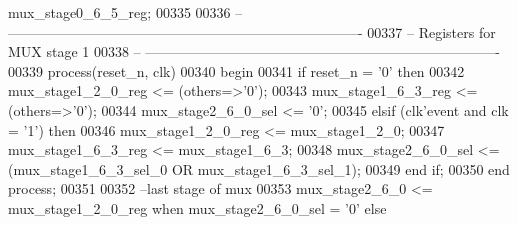 \begin{DoxyCode}
{      mux_stage0_6_5_reg};
00335 
00336 \textcolor{keyword}{-- ----------------------------------------------------------------------------}
00337 \textcolor{keyword}{-- Registers for MUX stage 1}
00338 \textcolor{keyword}{-- ---------------------------------------------------------------------------- }
00339 \textcolor{keywordflow}{process}(reset_n, clk)
00340 \textcolor{vhdlkeyword}{begin}
00341    \textcolor{keywordflow}{if} \textcolor{vhdlchar}{reset_n} \textcolor{vhdlchar}{=} \textcolor{vhdlchar}{'}\textcolor{vhdllogic}{}\textcolor{vhdllogic}{0}\textcolor{vhdlchar}{'} \textcolor{keywordflow}{then}
00342       \textcolor{vhdlchar}{mux_stage1_2_0_reg} \textcolor{vhdlchar}{<=} \textcolor{vhdlchar}{(}\textcolor{keywordflow}{others}\textcolor{vhdlchar}{=}\textcolor{vhdlchar}{>}\textcolor{vhdlchar}{'}\textcolor{vhdllogic}{}\textcolor{vhdllogic}{0}\textcolor{vhdlchar}{'}\textcolor{vhdlchar}{)};
00343       \textcolor{vhdlchar}{mux_stage1_6_3_reg} \textcolor{vhdlchar}{<=} \textcolor{vhdlchar}{(}\textcolor{keywordflow}{others}\textcolor{vhdlchar}{=}\textcolor{vhdlchar}{>}\textcolor{vhdlchar}{'}\textcolor{vhdllogic}{}\textcolor{vhdllogic}{0}\textcolor{vhdlchar}{'}\textcolor{vhdlchar}{)};
00344       \textcolor{vhdlchar}{mux_stage2_6_0_sel} \textcolor{vhdlchar}{<=} \textcolor{vhdlchar}{'}\textcolor{vhdllogic}{}\textcolor{vhdllogic}{0}\textcolor{vhdlchar}{'};
00345    \textcolor{keywordflow}{elsif} \textcolor{vhdlchar}{(}\textcolor{vhdlchar}{clk}\textcolor{vhdlchar}{'}\textcolor{vhdlkeyword}{event} \textcolor{keywordflow}{and} \textcolor{vhdlchar}{clk} \textcolor{vhdlchar}{=} \textcolor{vhdlchar}{'}\textcolor{vhdllogic}{}\textcolor{vhdllogic}{1}\textcolor{vhdlchar}{'}\textcolor{vhdlchar}{)} \textcolor{keywordflow}{then}
00346       \textcolor{vhdlchar}{mux_stage1_2_0_reg} \textcolor{vhdlchar}{<=} \textcolor{vhdlchar}{mux_stage1_2_0};
00347       \textcolor{vhdlchar}{mux_stage1_6_3_reg} \textcolor{vhdlchar}{<=} \textcolor{vhdlchar}{mux_stage1_6_3};
00348       \textcolor{vhdlchar}{mux_stage2_6_0_sel} \textcolor{vhdlchar}{<=} \textcolor{vhdlchar}{(}\textcolor{vhdlchar}{mux_stage1_6_3_sel_0} \textcolor{keywordflow}{OR} \textcolor{vhdlchar}{mux_stage1_6_3_sel_1}\textcolor{vhdlchar}{)}; 
00349    \textcolor{keywordflow}{end} \textcolor{keywordflow}{if};
00350 \textcolor{keywordflow}{end} \textcolor{keywordflow}{process};
00351 
00352 \textcolor{keyword}{--last stage of mux}
00353 \textcolor{vhdlchar}{mux_stage2_6_0} \textcolor{vhdlchar}{<=} \textcolor{vhdlchar}{mux_stage1_2_0_reg} \textcolor{keywordflow}{when} \textcolor{vhdlchar}{mux_stage2_6_0_sel} \textcolor{vhdlchar}{=} \textcolor{vhdlchar}{'}\textcolor{vhdllogic}{}\textcolor{vhdllogic}{0}\textcolor{vhdlchar}{'} \textcolor{keywordflow}{else} \textcolor{vhdlchar}{
}
\end{DoxyCode}
